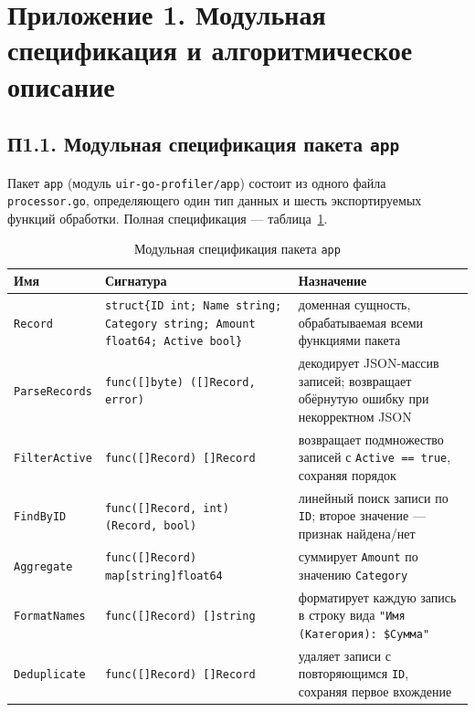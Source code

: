 \documentclass[12pt,a4paper]{article}
\newcommand{\newrazdel}{\clearpage}
\renewcommand{\thetable}{\thesection.\arabic{table}}
\numberwithin{equation}{section}
\begin{document}
\newrazdel
\section*{Приложение 1. Модульная спецификация и алгоритмическое описание}
\renewcommand{\thetable}{П1.\arabic{table}}
\setcounter{table}{0}

\subsection*{П1.1. Модульная спецификация пакета \texttt{app}}

Пакет \texttt{app} (модуль \texttt{uir-go-profiler/\allowbreak app}) состоит из одного
файла \texttt{processor.go}, определяющего один тип данных и шесть
экспортируемых функций обработки. Полная спецификация — таблица~\ref{tab:p1.1}.

\begin{table}[htbp]
\caption{Модульная спецификация пакета \texttt{app}}
\label{tab:p1.1}
\centering
\begin{tabular}{p{3.1cm}p{6.6cm}p{4.3cm}}
\toprule
Имя & Сигнатура & Назначение \\
\midrule
\texttt{Record} & \texttt{struct\{ID int; Name string; Category string; Amount float64; Active bool\}} & доменная сущность, обрабатываемая всеми функциями пакета \\
\texttt{ParseRecords} & \texttt{func([]byte) ([]Record, error)} & декодирует JSON-массив записей; возвращает обёрнутую ошибку при некорректном JSON \\
\texttt{FilterActive} & \texttt{func([]Record) []Record} & возвращает подмножество записей с \texttt{Active == true}, сохраняя порядок \\
\texttt{FindByID} & \texttt{func([]Record, int) (Record, bool)} & линейный поиск записи по \texttt{ID}; второе значение — признак найдена/нет \\
\texttt{Aggregate} & \texttt{func([]Record) map[string]float64} & суммирует \texttt{Amount} по значению \texttt{Category} \\
\texttt{FormatNames} & \texttt{func([]Record) []string} & форматирует каждую запись в строку вида \texttt{"Имя (Категория): \$Сумма"} \\
\texttt{Deduplicate} & \texttt{func([]Record) []Record} & удаляет записи с повторяющимся \texttt{ID}, сохраняя первое вхождение \\
\bottomrule
\end{tabular}
\end{table}
\end{document}
